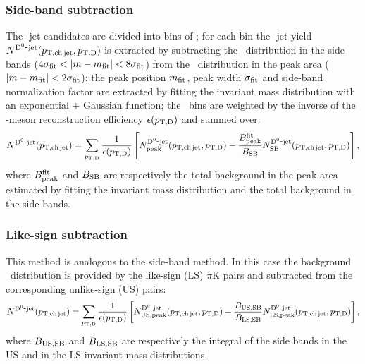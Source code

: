 \documentclass[a4paper]{jpconf}
\begin{document}
\subsubsection*{Side-band subtraction}
The \Dzero-jet candidates are divided into bins of \ptd; for each bin the \Dzero-jet yield $N^{\rm \mathrm{D^{0}}\hbox{-}jet}(p_{\mathrm{T,ch\, jet}},p_{\mathrm{T,D}})$ is extracted by subtracting the
\ptchjet\ distribution in the side bands ($4\sigma_{\rm fit} < \lvert m - m_{\rm fit} \rvert < 8\sigma_{\rm fit}$) 
from the \ptchjet\ distribution in the peak area ($\lvert m - m_{\rm fit} \rvert < 2\sigma_{\rm fit}$); the peak position $m_{\rm fit}$, peak width $\sigma_{\rm fit}$ and side-band normalization factor are extracted 
by fitting the invariant mass distribution with an exponential + Gaussian function; the \ptd\ bins are weighted by the inverse of the \Dzero-meson reconstruction efficiency $\epsilon(p_{\mathrm{T,D}})$ and summed over:
\begin{equation*}
N^{\rm \mathrm{D^{0}}\hbox{-}jet}(p_{\mathrm{T,ch\, jet}})=\sum_{p_{\mathrm{T,D}}} \frac{1}{\epsilon(p_{\mathrm{T,D}})} 
\left[N_{\rm peak}^{\rm \mathrm{D^{0}}\hbox{-}jet}(p_{\mathrm{T,ch\, jet}},p_{\mathrm{T,D}}) - 
\frac{B_{\rm peak}^{\rm fit}}{B_{\rm SB}} 
N_{\rm SB}^{\rm \mathrm{D^{0}}\hbox{-}jet}(p_{\mathrm{T,ch\, jet}},p_{\mathrm{T,D}})\right],
\end{equation*}
where $B_{\rm peak}^{\rm fit}$ and $B_{\rm SB}$ are respectively the total background
in the peak area estimated by fitting the invariant mass distribution and the total
background in the side bands.

\subsubsection*{Like-sign subtraction}
This method is analogous to the side-band method. In this case the background \ptchjet\ distribution is provided by the like-sign (LS) $\pi$K pairs and
subtracted from the corresponding unlike-sign (US) pairs:
\begin{equation*}
N^{\rm \mathrm{D^{0}}\hbox{-}jet}(p_{\mathrm{T,ch\, jet}})=\sum_{p_{\mathrm{T,D}}} \frac{1}{\epsilon(p_{\mathrm{T,D}})} 
\left[N_{\rm US, peak}^{\rm \mathrm{D^{0}}\hbox{-}jet}(p_{\mathrm{T,ch\, jet}},p_{\mathrm{T,D}}) - 
\frac{B_{\rm US, SB}}{B_{\rm LS, SB}} 
N_{\rm LS, peak}^{\rm \mathrm{D^{0}}\hbox{-}jet}(p_{\mathrm{T,ch\, jet}},p_{\mathrm{T,D}})\right],
\end{equation*}
where $B_{\rm US, SB}$ and $B_{\rm LS, SB}$ are respectively the integral of
the side bands in the US and in the LS invariant mass distributions.
\end{document}
